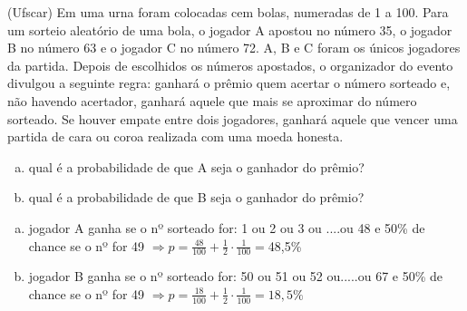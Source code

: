 \begin{ex}
(Ufscar) Em uma urna foram colocadas cem bolas, numeradas de 1 a 100. Para um sorteio aleatório de uma bola, o jogador A apostou no número 35, o jogador B no número 63 e o jogador C no número 72. A, B e C foram os únicos jogadores da partida. Depois de escolhidos os números apostados, o organizador do evento divulgou a seguinte regra:  ganhará o prêmio quem acertar o número sorteado e, não havendo acertador, ganhará aquele que mais se aproximar do número sorteado. Se houver empate entre dois jogadores, ganhará aquele que vencer uma partida de cara ou coroa realizada com uma moeda honesta. 
   \begin{enumerate}[(a)]
   \item qual é a probabilidade de que A seja o ganhador do prêmio?
   \item qual é a probabilidade de que B seja o ganhador do prêmio?
   \end{enumerate}
     \begin{sol}
      \phantom{A}
        \begin{enumerate}  [(a)]
            \item jogador A ganha se o nº sorteado for: 1 ou 2 ou 3 ou ....ou 48 e 50\% de chance se o nº for 49 $\Longrightarrow p = \frac{48}{100}+\frac{1}{2}\cdot \frac{1}{100}=$48,5\%
            \item jogador B ganha se o nº sorteado for: 50 ou 51 ou 52 ou.....ou 67 e 50\% de chance se o nº for 49 $\Longrightarrow p=\frac{18}{100}+\frac{1}{2}\cdot \frac{1}{100}= 18,5\%$
        \end{enumerate}
     \end{sol}
\end{ex}